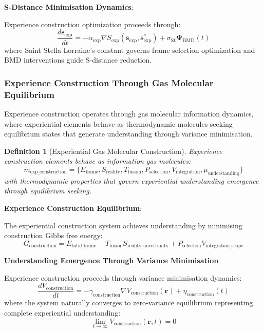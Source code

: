 \documentclass{article}
\newtheorem{definition}[theorem]{Definition}
\begin{document}
\textbf{S-Distance Minimisation Dynamics}:

Experience construction optimization proceeds through:
\begin{equation}
\frac{d\mathbf{s}_{\text{exp}}}{dt} = -\alpha_{\text{exp}} \nabla S_{\text{exp}}(\mathbf{s}_{\text{exp}}, \mathbf{s}_{\text{exp}}^*) + \sigma_{\text{St}} \mathbf{\Psi}_{\text{BMD}}(t)
\end{equation}
where Saint Stella-Lorraine's constant governs frame selection optimization and BMD interventions guide S-distance reduction.

\subsubsection{Experience Construction Through Gas Molecular Equilibrium}

Experience construction operates through gas molecular information dynamics, where experiential elements behave as thermodynamic molecules seeking equilibrium states that generate understanding through variance minimisation.

\begin{definition}[Experiential Gas Molecular Construction]
Experience construction elements behave as information gas molecules:
\begin{equation}
m_{\text{exp\_construction}} = \{E_{\text{frame}}, S_{\text{reality}}, T_{\text{fusion}}, P_{\text{selection}}, V_{\text{integration}}, \mu_{\text{understanding}}\}
\end{equation}
with thermodynamic properties that govern experiential understanding emergence through equilibrium seeking.
\end{definition}

\textbf{Experience Construction Equilibrium}:

The experiential construction system achieves understanding by minimising construction Gibbs free energy:
\begin{equation}
G_{\text{construction}} = E_{\text{total\_frame}} - T_{\text{fusion}} S_{\text{reality\_uncertainty}} + P_{\text{selection}} V_{\text{integration\_scope}}
\end{equation}

\textbf{Understanding Emergence Through Variance Minimisation}

Experience construction proceeds through variance minimisation dynamics:
\begin{equation}
\frac{dV_{\text{construction}}}{dt} = -\gamma_{\text{construction}} \nabla V_{\text{construction}}(\mathbf{r}) + \eta_{\text{construction}}(t)
\end{equation}
where the system naturally converges to zero-variance equilibrium representing complete experiential understanding:
\begin{equation}
\lim_{t \to \infty} V_{\text{construction}}(\mathbf{r}, t) = 0
\end{equation}
\end{document}

